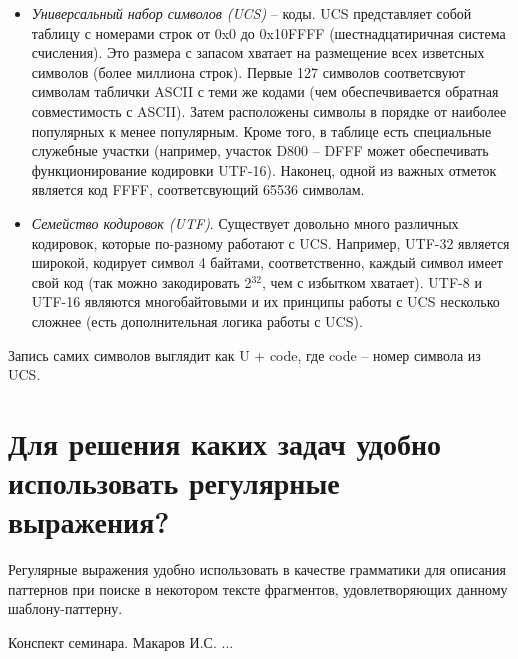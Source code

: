 \documentclass[a4paper,12pt]{article}	%
\begin{document}
	\begin{itemize}

		\item \textit{Универсальный набор символов (UCS)} -- коды. UCS представляет собой таблицу с номерами строк от 0x0 до 0x10FFFF (шестнадцатиричная система счисления). Это размера с запасом хватает на размещение всех изветсных символов (более миллиона строк). Первые 127 символов соответсвуют символам таблички ASCII с теми же кодами (чем обеспечвивается обратная совместимость с ASCII). Затем расположены символы в порядке от наиболее популярных к менее популярным. Кроме того, в таблице есть специальные служебные участки (например, участок D800 -- DFFF может обеспечивать функционирование кодировки UTF-16). Наконец, одной из важных отметок является код FFFF, соответсвующий 65536 символам.
	
		\item \textit{Семейство кодировок (UTF)}. Существует довольно много различных кодировок, которые по-разному работают с UCS. Например, UTF-32 является широкой, кодирует символ 4 байтами, соответственно, каждый символ имеет свой код (так можно закодировать 2$^{32}$, чем с избытком хватает). UTF-8 и UTF-16 являются многобайтовыми и их принципы работы с UCS несколько сложнее (есть дополнительная логика работы с UCS).
	
	\end{itemize}

	Запись самих символов выглядит как U + code, где code -- номер символа из UCS.

\section{Для решения каких задач удобно использовать регулярные выражения?}
	
	Регулярные выражения удобно использовать в качестве грамматики для описания паттернов при поиске в некотором тексте фрагментов, удовлетворяющих данному шаблону-паттерну.

\newpage


 
	\begin{thebibliography}{}
	
		 Конспект семинара. Макаров И.С.
		 ...
		
	\end{thebibliography}
\end{document}
